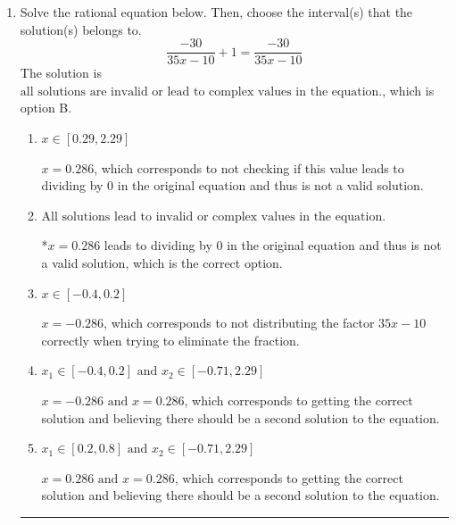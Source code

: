 \documentclass{extbook}[14pt]
\newcommand{\litem}[1]{\item #1

\rule{\textwidth}{0.4pt}}
\begin{document}
\begin{enumerate}\litem{
Solve the rational equation below. Then, choose the interval(s) that the solution(s) belongs to.
\[ \frac{-30}{35x -10} + 1 = \frac{-30}{35x -10} \]The solution is \( \text{all solutions are invalid or lead to complex values in the equation.} \), which is option B.\begin{enumerate}[label=\Alph*.]
\item \( x \in [0.29,2.29] \)

$x = 0.286$, which corresponds to not checking if this value leads to dividing by 0 in the original equation and thus is not a valid solution.
\item \( \text{All solutions lead to invalid or complex values in the equation.} \)

*$x = 0.286$ leads to dividing by 0 in the original equation and thus is not a valid solution, which is the correct option.
\item \( x \in [-0.4,0.2] \)

$x = -0.286$, which corresponds to not distributing the factor $35x -10$ correctly when trying to eliminate the fraction.
\item \( x_1 \in [-0.4, 0.2] \text{ and } x_2 \in [-0.71,2.29] \)

$x = -0.286 \text{ and } x = 0.286$, which corresponds to getting the correct solution and believing there should be a second solution to the equation.
\item \( x_1 \in [0.2, 0.8] \text{ and } x_2 \in [-0.71,2.29] \)

$x = 0.286 \text{ and } x = 0.286$, which corresponds to getting the correct solution and believing there should be a second solution to the equation.
\end{enumerate}

}
\end{enumerate}
\end{document}
